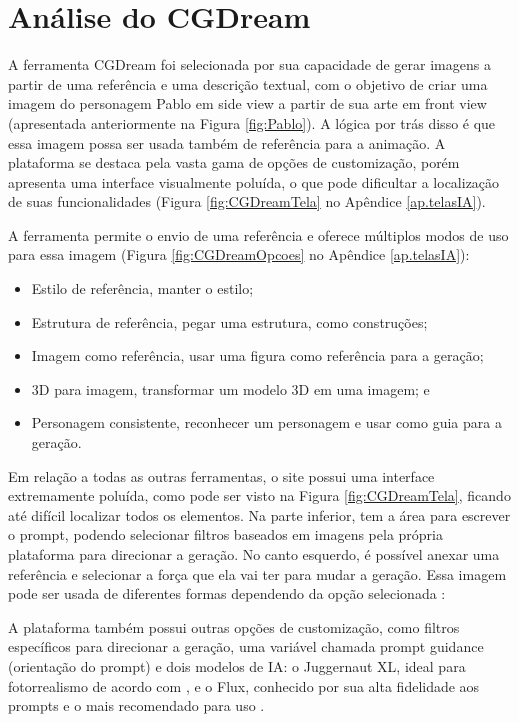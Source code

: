 \FloatBarrier
\section{Análise do CGDream}
\label{s.CGDream}

A ferramenta CGDream foi selecionada por sua capacidade de gerar imagens a partir de uma referência e uma descrição textual, com o objetivo de criar uma imagem do personagem Pablo em side view a partir de sua arte em front view (apresentada anteriormente na Figura \ref{fig:Pablo}). A lógica por trás disso é que essa imagem possa ser usada também de referência para a animação. A plataforma se destaca pela vasta gama de opções de customização, porém apresenta uma interface visualmente poluída, o que pode dificultar a localização de suas funcionalidades (Figura \ref{fig:CGDreamTela} no Apêndice \ref{ap.telasIA}).

A ferramenta permite o envio de uma referência e oferece múltiplos modos de uso para essa imagem (Figura \ref{fig:CGDreamOpcoes} no Apêndice \ref{ap.telasIA}):

\begin{itemize}
    \item Estilo de referência, manter o estilo;
    \item Estrutura de referência, pegar uma estrutura, como construções;
    \item Imagem como referência, usar uma figura como referência para a geração;
    \item 3D para imagem, transformar um modelo 3D em uma imagem; e
    \item Personagem consistente, reconhecer um personagem e usar como guia para a geração.
\end{itemize}


Em relação a todas as outras ferramentas, o site possui uma interface extremamente poluída, como pode ser visto na Figura \ref{fig:CGDreamTela}, ficando até difícil localizar todos os elementos. Na parte inferior, tem a área para escrever o prompt, podendo selecionar filtros baseados em imagens pela própria plataforma para direcionar a geração. No canto esquerdo, é possível anexar uma referência e selecionar a força que ela vai ter para mudar a geração. Essa  imagem pode ser usada de diferentes formas dependendo da opção selecionada : 

A plataforma também possui outras opções de customização, como filtros específicos para direcionar a geração, uma variável chamada prompt guidance (orientação do prompt) e dois modelos de IA: o Juggernaut XL, ideal para fotorrealismo de acordo com \cite{xu_cohen_clark_2025}, e o Flux, conhecido por sua alta fidelidade aos prompts \cite{greenberg} e o mais recomendado para uso \cite{cgdream_video}.


